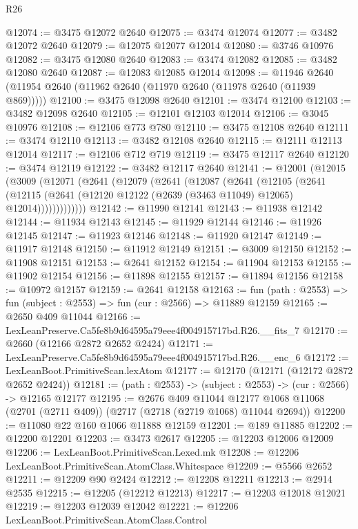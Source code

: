 \begin{lexlean}{R26}
\begin{coremodule}
@12074 := @3475 @12072 @2640
@12075 := @3474 @12074
@12077 := @3482 @12072 @2640
@12079 := @12075 @12077 @12014
@12080 := @3746 @10976
@12082 := @3475 @12080 @2640
@12083 := @3474 @12082
@12085 := @3482 @12080 @2640
@12087 := @12083 @12085 @12014
@12098 := @11946 @2640 (@11954 @2640 (@11962 @2640 (@11970 @2640 (@11978 @2640 (@11939 @869)))))
@12100 := @3475 @12098 @2640
@12101 := @3474 @12100
@12103 := @3482 @12098 @2640
@12105 := @12101 @12103 @12014
@12106 := @3045 @10976
@12108 := @12106 @773 @780
@12110 := @3475 @12108 @2640
@12111 := @3474 @12110
@12113 := @3482 @12108 @2640
@12115 := @12111 @12113 @12014
@12117 := @12106 @712 @719
@12119 := @3475 @12117 @2640
@12120 := @3474 @12119
@12122 := @3482 @12117 @2640
@12141 := @12001
    (@12015
      (@3009
        (@12071
          (@2641
            (@12079
              (@2641
                (@12087
                  (@2641
                    (@12105
                      (@2641
                        (@12115
                          (@2641 (@12120 @12122 (@2639 (@3463 @11049) @12065) @12014)))))))))))))
@12142 := @11990 @12141
@12143 := @11938 @12142
@12144 := @11934 @12143
@12145 := @11929 @12144
@12146 := @11926 @12145
@12147 := @11923 @12146
@12148 := @11920 @12147
@12149 := @11917 @12148
@12150 := @11912 @12149
@12151 := @3009 @12150
@12152 := @11908 @12151
@12153 := @2641 @12152
@12154 := @11904 @12153
@12155 := @11902 @12154
@12156 := @11898 @12155
@12157 := @11894 @12156
@12158 := @10972 @12157
@12159 := @2641 @12158
@12163 := fun (path : @2553) => fun (subject : @2553) => fun (cur : @2566) => @11889 @12159
@12165 := @2650 @409 @11044
@12166 := LexLeanPreserve.Ca5fe8b9d64595a79eee4f004915717bd.R26.__fits_7
@12170 := @2660 (@12166 @2872 @2652 @2424)
@12171 := LexLeanPreserve.Ca5fe8b9d64595a79eee4f004915717bd.R26.__enc_6
@12172 := LexLeanBoot.PrimitiveScan.lexAtom
@12177 := @12170 (@12171 (@12172 @2872 @2652 @2424))
@12181 := (path : @2553) -> (subject : @2553) -> (cur : @2566) -> @12165 @12177
@12195 := @2676
    @409
    @11044
    @12177
    @1068
    @11068
    (@2701 (@2711 @409))
    (@2717 (@2718 (@2719 @1068) @11044 @2694))
@12200 := @11080 @22 @160 @1066 @11888 @12159
@12201 := @189 @11885
@12202 := @12200 @12201
@12203 := @3473 @2617
@12205 := @12203 @12006 @12009
@12206 := LexLeanBoot.PrimitiveScan.Lexed.mk
@12208 := @12206 LexLeanBoot.PrimitiveScan.AtomClass.Whitespace
@12209 := @5566 @2652
@12211 := @12209 @90 @2424
@12212 := @12208 @12211
@12213 := @2914 @2535
@12215 := @12205 (@12212 @12213)
@12217 := @12203 @12018 @12021
@12219 := @12203 @12039 @12042
@12221 := @12206 LexLeanBoot.PrimitiveScan.AtomClass.Control

\end{coremodule}
\end{lexlean}
